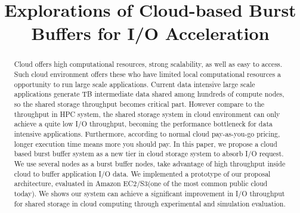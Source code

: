 \documentclass[10pt, conference, compsocconf]{IEEEtran}
\begin{document}
\newcommand {\xtq}[1] {\begin{color}{red}{[XTQ : #1]}\end{color}}
\title{Explorations of Cloud-based Burst Buffers for I/O Acceleration}%

\author{
	\and
	\and
}

\maketitle

\begin{abstract}
Cloud offers high computational resources, strong scalability, as well as easy to access. 
Such cloud environment offers these who have limited local computational resources a opportunity to
run large scale applications.
Current data intensive large scale applications generate TB intermediate data shared among hundreds
of compute nodes, so the shared storage throughput becomes critical part.
However compare to the throughput in HPC system, the shared storage
system in cloud environment can only achieve a quite low I/O throughput, becoming the
performance bottleneck for data intensive applications.
Furthermore, according to normal cloud pay-as-you-go pricing, longer execution time means more you
should pay.
In this paper, we propose a cloud based burst
buffer system as a new tier in cloud storage system to absorb I/O request.
We use several nodes as a burst buffer nodes, take advantage of high throughput inside cloud to
buffer application I/O data.
We implemented a prototype of our proposal architecture, evaluated in Amazon EC2/S3(one of the most
common public cloud today).
We shows our system can achieve a significant improvement in I/O throughput for shared storage
in cloud computing through experimental and simulation evaluation.
\end{abstract}
\end{document}
